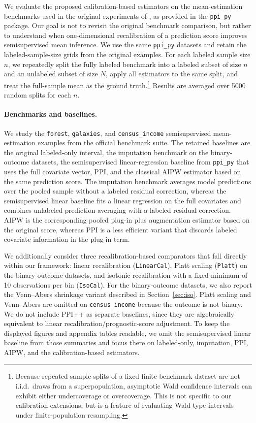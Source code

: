 \documentclass{article}
\theoremstyle{plain}
\theoremstyle{definition}
\newcommand{\1}{\mathbbm{1}}
\begin{document}
We evaluate the proposed calibration-based estimators on the mean-estimation benchmarks used in the original experiments of \citet{ppi2023,angelopoulos2023ppi}, as provided in the \texttt{ppi\_py} package. Our goal is not to revisit the original benchmark comparison, but rather to understand when one-dimensional recalibration of a prediction score improves semisupervised mean inference. We use the same \texttt{ppi\_py} datasets and retain the labeled-sample-size grids from the original examples. For each labeled sample size \(n\), we repeatedly split the fully labeled benchmark into a labeled subset of size \(n\) and an unlabeled subset of size \(N\), apply all estimators to the same split, and treat the full-sample mean as the ground truth.\footnote{Because repeated sample splits of a fixed finite benchmark dataset are not i.i.d.\ draws from a superpopulation, asymptotic Wald confidence intervals can exhibit either undercoverage or overcoverage. This is not specific to our calibration extensions, but is a feature of evaluating Wald-type intervals under finite-population resampling.} Results are averaged over 5000 random splits for each \(n\).



\paragraph{Benchmarks and baselines.}
We study the \texttt{forest}, \texttt{galaxies}, and \texttt{census\_income} semisupervised mean-estimation examples from the official benchmark suite. The retained baselines are the original labeled-only interval, the imputation benchmark on the binary-outcome datasets, the semisupervised linear-regression baseline from \texttt{ppi\_py} that uses the full covariate vector, PPI, and the classical AIPW estimator based on the same prediction score. The imputation benchmark averages model predictions over the pooled sample without a labeled residual correction, whereas the semisupervised linear baseline fits a linear regression on the full covariates and combines unlabeled prediction averaging with a labeled residual correction. AIPW is the corresponding pooled plug-in plus augmentation estimator based on the original score, whereas PPI is a less efficient variant that discards labeled covariate information in the plug-in term.

We additionally consider three recalibration-based comparators that fall directly within our framework: linear recalibration (\texttt{LinearCal}), Platt scaling (\texttt{Platt}) on the binary-outcome datasets, and isotonic recalibration with a fixed minimum of 10 observations per bin (\texttt{IsoCal}). For the binary-outcome datasets, we also report the Venn--Abers shrinkage variant described in Section~\ref{sec:iso}. Platt scaling and Venn--Abers are omitted on \texttt{census\_income} because the outcome is not binary. We do not include PPI++ as separate baselines, since they are algebraically equivalent to linear recalibration/prognostic-score adjustment. To keep the displayed figures and appendix tables readable, we omit the semisupervised linear baseline from those summaries and focus there on labeled-only, imputation, PPI, AIPW, and the calibration-based estimators.
\end{document}
